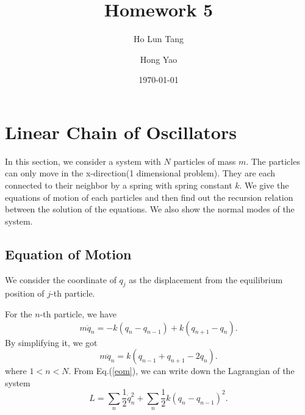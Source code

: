 \documentclass[%
 reprint,
 amsmath,amssymb,
 aps,
]{revtex4-1}
\begin{document}

\title{Homework 5}%

\author{Ho Lun Tang}


\author{Hong Yao}
 
%



\date{\today}%


\maketitle


\section{Linear Chain of Oscillators}

In this section, we consider a system with $N$ particles of mass $m$. The particles can only move in the x-direction(1 dimensional problem). They are each connected to their neighbor by a spring with spring constant $k$. We give the equations of motion of each particles and then find out the recursion relation between the solution of the equations. We also show the normal modes of the system.
\subsection{Equation of Motion}
We consider the coordinate of $q_j$ as the displacement from the equilibrium position of $j$-th particle.

For the $n$-th particle, we have
\begin{equation}
    m\ddot{q}_n=-k(q_n-q_{n-1})+k(q_{n+1}-q_n).
    \label{eom}
\end{equation}
By simplifying it, we got
\begin{equation}
    m\ddot{q}_n=k(q_{n-1}+q_{n+1}-2q_n).
\end{equation}
where $1<n<N$.
From Eq.(\ref{eom}), we can write down the Lagrangian of the system
\begin{equation}
    L=\sum_n\frac{1}{2}\dot{q}_n^2+\sum_n\frac{1}{2}k(q_{n}-q_{n-1})^2.
\end{equation}
\end{document}
